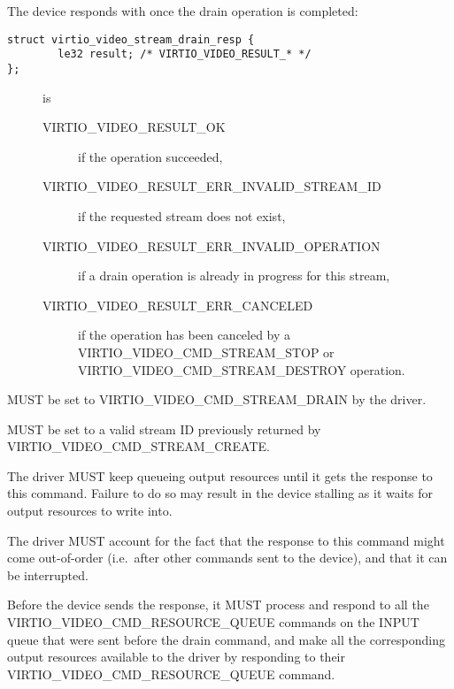 The device responds with 
once the drain operation is completed:

\begin{lstlisting}
struct virtio_video_stream_drain_resp {
        le32 result; /* VIRTIO_VIDEO_RESULT_* */
};
\end{lstlisting}

\begin{description}
\item[]
is

\begin{description}
\item[VIRTIO\_VIDEO\_RESULT\_OK]
if the operation succeeded,
\item[VIRTIO\_VIDEO\_RESULT\_ERR\_INVALID\_STREAM\_ID]
if the requested stream does not exist,
\item[VIRTIO\_VIDEO\_RESULT\_ERR\_INVALID\_OPERATION]
if a drain operation is already in progress for this stream,
\item[VIRTIO\_VIDEO\_RESULT\_ERR\_CANCELED]
if the operation has been canceled by a VIRTIO\_VIDEO\_CMD\_STREAM\_STOP
or VIRTIO\_VIDEO\_CMD\_STREAM\_DESTROY operation.
\end{description}
\end{description}


 MUST be set to VIRTIO\_VIDEO\_CMD\_STREAM\_DRAIN by the
driver.

 MUST be set to a valid stream ID previously returned
by VIRTIO\_VIDEO\_CMD\_STREAM\_CREATE.

The driver MUST keep queueing output resources until it gets the
response to this command. Failure to do so may result in the device
stalling as it waits for output resources to write into.

The driver MUST account for the fact that the response to this command
might come out-of-order (i.e.~after other commands sent to the device),
and that it can be interrupted.


Before the device sends the response, it MUST process and respond to all
the VIRTIO\_VIDEO\_CMD\_RESOURCE\_QUEUE commands on the INPUT queue that
were sent before the drain command, and make all the corresponding
output resources available to the driver by responding to their
VIRTIO\_VIDEO\_CMD\_RESOURCE\_QUEUE command.

